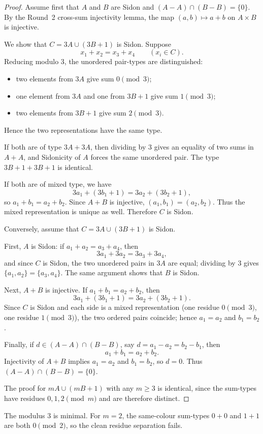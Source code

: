 \begin{proof}
Assume first that $A$ and $B$ are Sidon and $(A-A)\cap(B-B)=\{0\}$.  By the Round~2 cross-sum injectivity lemma, the map $(a,b)\mapsto a+b$ on $A\times B$ is injective.

We show that $C=3A\cup(3B+1)$ is Sidon.  Suppose
\[
x_1+x_2=x_3+x_4
\qquad (x_i\in C).
\]
Reducing modulo $3$, the unordered pair-types are distinguished:
\begin{itemize}
\item two elements from $3A$ give sum $0\pmod 3$;
\item one element from $3A$ and one from $3B+1$ give sum $1\pmod 3$;
\item two elements from $3B+1$ give sum $2\pmod 3$.
\end{itemize}
Hence the two representations have the same type.

If both are of type $3A+3A$, then dividing by $3$ gives an equality of two sums in $A+A$, and Sidonicity of $A$ forces the same unordered pair.  The type $3B+1+3B+1$ is identical.

If both are of mixed type, we have
\[
3a_1+(3b_1+1)=3a_2+(3b_2+1),
\]
so $a_1+b_1=a_2+b_2$.  Since $A+B$ is injective, $(a_1,b_1)=(a_2,b_2)$.  Thus the mixed representation is unique as well.  Therefore $C$ is Sidon.

Conversely, assume that $C=3A\cup(3B+1)$ is Sidon.

First, $A$ is Sidon: if $a_1+a_2=a_3+a_4$, then
\[
3a_1+3a_2=3a_3+3a_4,
\]
and since $C$ is Sidon, the two unordered pairs in $3A$ are equal; dividing by $3$ gives $\{a_1,a_2\}=\{a_3,a_4\}$.  The same argument shows that $B$ is Sidon.

Next, $A+B$ is injective.  If $a_1+b_1=a_2+b_2$, then
\[
3a_1+(3b_1+1)=3a_2+(3b_2+1).
\]
Since $C$ is Sidon and each side is a mixed representation (one residue $0\pmod 3$, one residue $1\pmod 3$), the two ordered pairs coincide; hence $a_1=a_2$ and $b_1=b_2$.

Finally, if $d\in (A-A)\cap(B-B)$, say $d=a_1-a_2=b_2-b_1$, then
\[
a_1+b_1=a_2+b_2.
\]
Injectivity of $A+B$ implies $a_1=a_2$ and $b_1=b_2$, so $d=0$.  Thus $(A-A)\cap(B-B)=\{0\}$.

The proof for $mA\cup(mB+1)$ with any $m\ge 3$ is identical, since the sum-types have residues $0,1,2\pmod m$ and are therefore distinct.
\end{proof}

\begin{remark}
The modulus $3$ is minimal.  For $m=2$, the same-colour sum-types $0+0$ and $1+1$ are both $0\pmod 2$, so the clean residue separation fails.
\end{remark}

